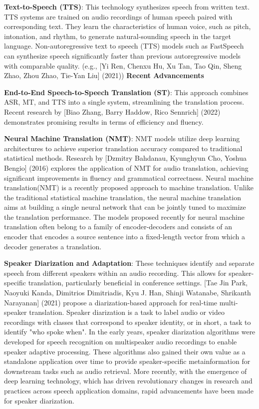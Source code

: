 \documentclass[12px, a4paper]{article}
\begin{document}
\textbf{Text-to-Speech (TTS)}: This technology synthesizes speech from written text. TTS systems are trained on audio recordings of human speech paired with corresponding text. They learn the characteristics of human voice, such as pitch, intonation, and rhythm, to generate natural-sounding speech in the target language. Non-autoregressive text to speech (TTS) models such as FastSpeech can synthesize speech significantly faster than previous autoregressive models with comparable quality. (e.g., [Yi Ren, Chenxu Hu, Xu Tan, Tao Qin, Sheng Zhao, Zhou Zhao, Tie-Yan Liu] (2021)) \linebreak\linebreak
\textbf{Recent Advancements}

\textbf{End-to-End Speech-to-Speech Translation (ST)}: This approach combines ASR, MT, and TTS into a single system, streamlining the translation process. Recent research by [Biao Zhang, Barry Haddow, Rico Sennrich] (2022) demonstrates promising results in terms of efficiency and fluency.

\textbf{Neural Machine Translation (NMT)}: NMT models utilize deep learning architectures to achieve superior translation accuracy compared to traditional statistical methods. Research by [Dzmitry Bahdanau, Kyunghyun Cho, Yoshua Bengio] (2016) explores the application of NMT for audio translation, achieving significant improvements in fluency and grammatical correctness. Neural machine translation(NMT) is a recently proposed approach to machine translation. Unlike the traditional statistical machine translation, the neural machine translation aims at building a single neural network that can be jointly tuned to maximize the translation performance. The models proposed recently for neural machine translation often belong to a family of encoder-decoders and consists of an encoder that encodes a source sentence into a fixed-length vector from which a decoder generates a translation.

\textbf{Speaker Diarization and Adaptation}: These techniques identify and separate speech from different speakers within an audio recording. This allows for speaker-specific translation, particularly beneficial in conference settings. [Tae Jin Park, Naoyuki Kanda, Dimitrios Dimitriadis, Kyu J. Han, Shinji Watanabe, Shrikanth Narayanan] (2021) propose a diarization-based approach for real-time multi-speaker translation. Speaker diarization is a task to label audio or video recordings with classes that correspond to speaker identity, or in short, a task to identify "who spoke when". In the early years, speaker diarization algorithms were developed for speech recognition on multispeaker audio recordings to enable speaker adaptive processing. These algorithms also gained their own value as a standalone application over time to provide speaker-specific metainformation for downstream tasks such as audio retrieval. More recently, with the emergence of deep learning technology, which has driven revolutionary changes in research and practices across speech application domains, rapid advancements have been made for speaker diarization. \linebreak\linebreak
\end{document}
